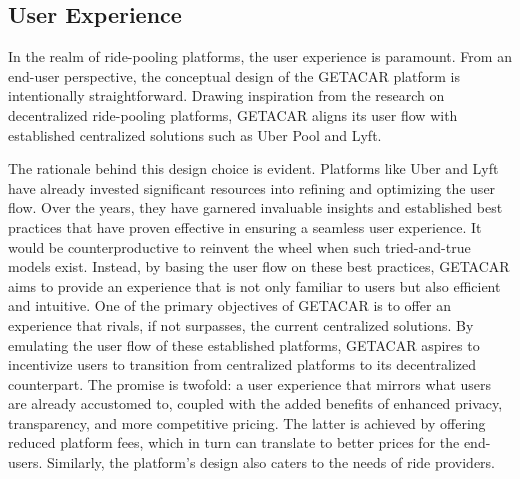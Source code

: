 \subsection{User Experience}
In the realm of ride-pooling platforms, the user experience is paramount. From an end-user perspective, the conceptual design of the GETACAR platform is intentionally straightforward. Drawing inspiration from the research on decentralized ride-pooling platforms, GETACAR aligns its user flow with established centralized solutions such as Uber Pool and Lyft.

The rationale behind this design choice is evident. Platforms like Uber and Lyft have already invested significant resources into refining and optimizing the user flow. Over the years, they have garnered invaluable insights and established best practices that have proven effective in ensuring a seamless user experience. It would be counterproductive to reinvent the wheel when such tried-and-true models exist. Instead, by basing the user flow on these best practices, GETACAR aims to provide an experience that is not only familiar to users but also efficient and intuitive. 
One of the primary objectives of GETACAR is to offer an experience that rivals, if not surpasses, the current centralized solutions. By emulating the user flow of these established platforms, GETACAR aspires to incentivize users to transition from centralized platforms to its decentralized counterpart. The promise is twofold: a user experience that mirrors what users are already accustomed to, coupled with the added benefits of enhanced privacy, transparency, and more competitive pricing. The latter is achieved by offering reduced platform fees, which in turn can translate to better prices for the end-users. 
Similarly, the platform's design also caters to the needs of ride providers. 

